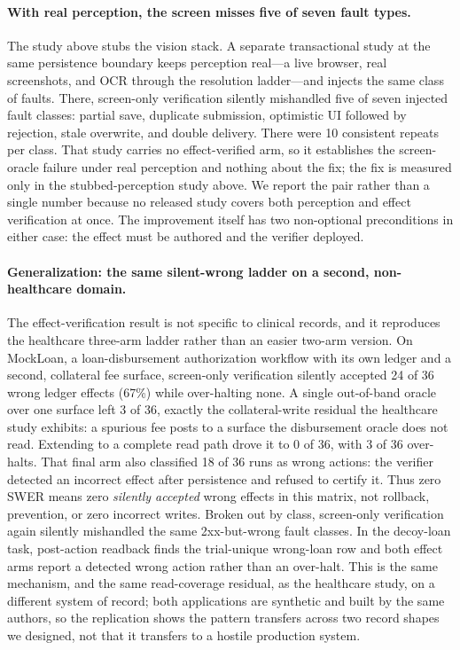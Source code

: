 \paragraph{With real perception, the screen misses five of seven fault types.}
The study above stubs the vision stack. A separate transactional study at the
same persistence boundary keeps perception real---a live browser, real
screenshots, and OCR through the resolution ladder---and injects the same class
of faults. There, screen-only
verification silently mishandled five of seven injected fault classes: partial
save, duplicate submission, optimistic UI followed by rejection, stale overwrite,
and double delivery. There were 10 consistent repeats per class. That study
carries no effect-verified arm, so it establishes the screen-oracle failure
under real perception and nothing about the fix; the fix is measured only in the
stubbed-perception study above. We report the pair rather than a single number
because no released study covers both perception and effect verification at
once. The improvement itself has two non-optional
preconditions in either case: the effect must be authored and the verifier
deployed.

\paragraph{Generalization: the same silent-wrong ladder on a second,
non-healthcare domain.} The effect-verification result is not specific to
clinical records, and it reproduces the healthcare three-arm ladder rather than
an easier two-arm version. On MockLoan, a loan-disbursement authorization
workflow with its own ledger and a second, collateral fee surface, screen-only
verification silently accepted 24 of 36 wrong ledger effects (67\%) while
over-halting none. A single out-of-band oracle over one surface left 3 of 36,
exactly the collateral-write residual the healthcare study exhibits: a spurious
fee posts to a surface the disbursement oracle does not read. Extending to a
complete read path drove it to 0 of 36, with 3 of 36 over-halts.
That final arm also classified 18 of 36 runs as wrong actions: the verifier
detected an incorrect effect after persistence and refused to certify it. Thus
zero SWER means zero \emph{silently accepted} wrong effects in this matrix, not
rollback, prevention, or zero incorrect writes.
Broken out by class, screen-only verification again silently mishandled the same
2xx-but-wrong fault classes. In the decoy-loan task, post-action readback finds
the trial-unique wrong-loan row and both effect arms report a detected wrong
action rather than an over-halt. This is the same mechanism, and the same read-coverage
residual, as the healthcare study, on a different system of record; both
applications are synthetic and built by the same authors, so the replication
shows the pattern transfers across two record shapes we designed, not that it
transfers to a hostile production system.

